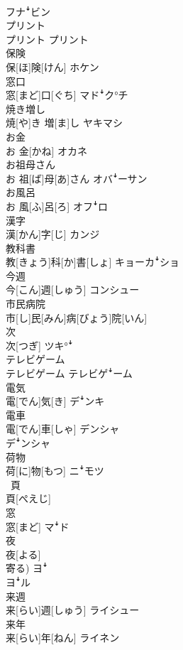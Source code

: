 \documentclass[8pt]{extreport}
\begin{document}
\begin{CJK}{UTF8}{min}
\\	フナꜜビン
\\	プリント	
\\	プリント	プリント
\\	保険	
\\	保[ほ]険[けん]	ホケン
\\	窓口	
\\	窓[まど]口[ぐち]	マドꜜク°チ
\\	焼き増し	
\\	焼[や]き 増[ま]し	ヤキマシ
\\	お金	
\\	お 金[かね]	オカネ
\\	お祖母さん	
\\	お 祖[ば]母[あ]さん	オバꜜーサン
\\	お風呂	
\\	お 風[ふ]呂[ろ]	オフꜜロ
\\	漢字	
\\	漢[かん]字[じ]	カンジ
\\	教科書	
\\	教[きょう]科[か]書[しょ]	キョーカꜜショ
\\	今週	
\\	今[こん]週[しゅう]	コンシュー
\\	市民病院	
\\	市[し]民[みん]病[びょう]院[いん]	
\\	次	
\\	次[つぎ]	ツキ°ꜜ
\\	テレビゲーム	
\\	テレビゲーム	テレビゲꜜーム
\\	電気	
\\	電[でん]気[き]	デꜜンキ
\\	電車	
\\	電[でん]車[しゃ]	デンシャ 
\\	デꜜンシャ
\\	荷物	
\\	荷[に]物[もつ]	ニꜜモツ
\\	~頁	
\\	頁[ぺえじ]	
\\	窓	
\\	窓[まど]	マꜜド
\\	夜	
\\	夜[よる] 
\\	寄る)	ヨꜜ 
\\	ヨꜜル
\\	来週	
\\	来[らい]週[しゅう]	ライシュー
\\	来年	
\\	来[らい]年[ねん]	ライネン

\end{CJK}
\end{document}

